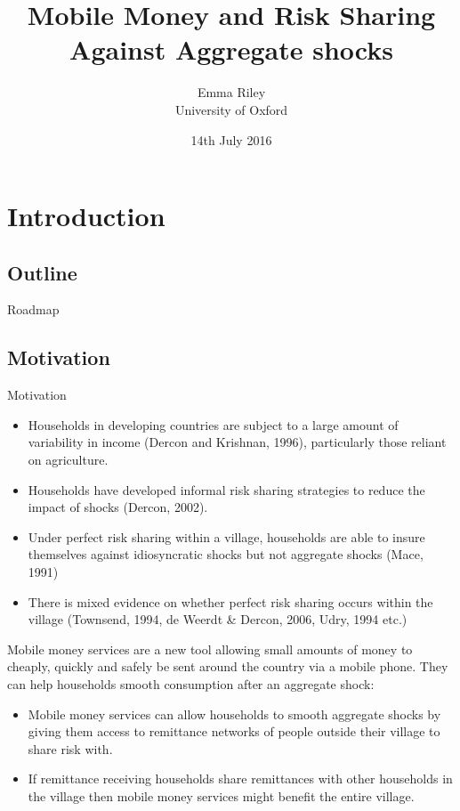 \documentclass[t]{beamer}
\title[Mobile money risk sharing presentation]{Mobile Money and Risk Sharing Against Aggregate shocks}
\author[Emma Riley]{Emma Riley  \\
University of Oxford}
\institute[NOVAFRICA conference 2016l]{NOVAFRICA conference 2016}
\date{14th July 2016}
\begin{document}
\begin{frame}
  \titlepage
\end{frame}

\section{Introduction}

\subsection*{Outline}
\begin{frame}{Roadmap}
  \tableofcontents
\end{frame}

\subsection*{Motivation}
\begin{frame}[allowframebreaks]{Motivation}
\begin{itemize}
\item Households in developing countries are subject to a large amount of variability in income (Dercon and Krishnan, 1996), particularly those reliant on agriculture. 
\item Households
have developed informal risk sharing strategies to reduce the impact of shocks (Dercon, 2002).
\item Under perfect risk sharing within a village, households are able to insure themselves against idiosyncratic shocks but not aggregate shocks (Mace, 1991)
\item There is mixed evidence on whether perfect risk sharing occurs within the village (Townsend, 1994, de Weerdt \& Dercon, 2006, Udry, 1994 etc.)
\end{itemize}
\framebreak 

Mobile money services are a new tool allowing small amounts of money to cheaply, quickly and safely be sent around the country via a mobile phone. They can help households smooth consumption after an aggregate shock:
\begin{itemize}
\item Mobile money services can allow households to smooth aggregate shocks by giving them access to remittance networks of people outside their village to share risk with.  
\item If remittance receiving households share remittances with other households in the village then mobile money services might benefit the entire village. 
\end{itemize}
\end{frame}
\end{document}
